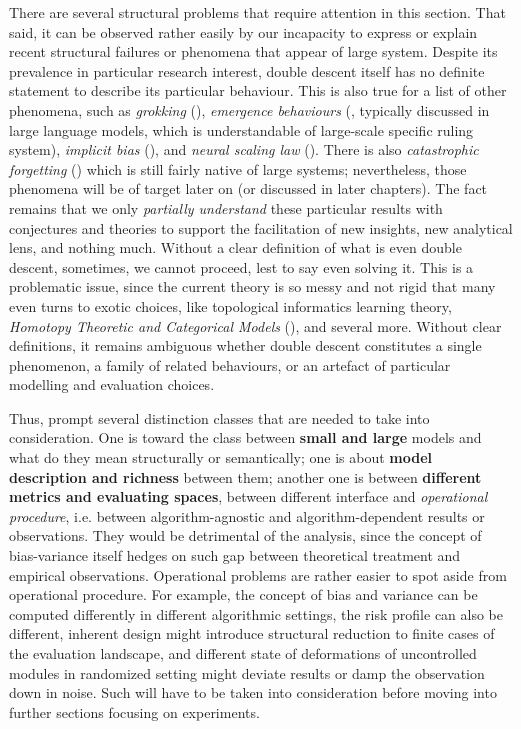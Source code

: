 There are several structural problems that require attention in this section. That said, it can be observed rather easily by our incapacity to express or explain recent structural failures or phenomena that appear of large system. Despite its prevalence in particular research interest, double descent itself has no definite statement to describe its particular behaviour. This is also true for a list of other phenomena, such as \textit{grokking} (\cite{power2022grokkinggeneralizationoverfittingsmall}), \textit{emergence behaviours} (\cite{wei2022emergentabilitieslargelanguage}, typically discussed in large language models, which is understandable of large-scale specific ruling system), \textit{implicit bias} (\cite{soudry2024implicitbiasgradientdescent}), and \textit{neural scaling law} (\cite{kaplan2020scalinglawsneurallanguage,wei2022emergentabilitieslargelanguage}). There is also \textit{catastrophic forgetting} (\cite{vandeven2024continuallearningcatastrophicforgetting}) which is still fairly native of large systems; nevertheless, those phenomena will be of target later on (or discussed in later chapters). The fact remains that we only \textit{partially understand} these particular results with conjectures and theories to support the facilitation of new insights, new analytical lens, and nothing much. Without a clear definition of what is even double descent, sometimes, we cannot proceed, lest to say even solving it. This is a problematic issue, since the current theory is so messy and not rigid that many even turns to exotic choices, like topological informatics learning theory, \textit{Homotopy Theoretic and Categorical Models} (\cite{Manin_2024}), and several more. Without clear definitions, it remains ambiguous whether double descent constitutes a single phenomenon, a family of related behaviours, or an artefact of particular modelling and evaluation choices. 

Thus, prompt several distinction classes that are needed to take into consideration. One is toward the class between \textbf{small and large} models and what do they mean structurally or semantically; one is about \textbf{model description and richness} between them; another one is between \textbf{different metrics and evaluating spaces}, between different interface and \textit{operational procedure}, i.e. between algorithm-agnostic and algorithm-dependent results or observations. They would be detrimental of the analysis, since the concept of bias-variance itself hedges on such gap between theoretical treatment and empirical observations. Operational problems are rather easier to spot aside from operational procedure. For example, the concept of bias and variance can be computed differently in different algorithmic settings, the risk profile can also be different, inherent design might introduce structural reduction to finite cases of the evaluation landscape, and different state of deformations of uncontrolled modules in randomized setting might deviate results or damp the observation down in noise. Such will have to be taken into consideration before moving into further sections focusing on experiments. 

